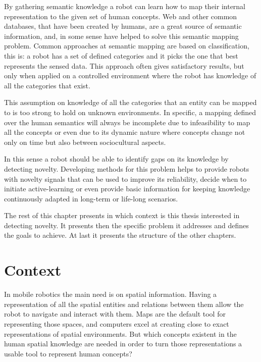 By gathering semantic knowledge a robot can learn how to map their internal representation to the
given set of human concepts. Web and other common databases, that have been created by humans, are a
great source of semantic information, and, in some sense have helped to solve this semantic mapping
problem.
Common approaches at semantic mapping are based on classification, this is: a robot has a set of
defined categories and it picks the one that best represents the sensed data. This approach often
gives satisfactory results, but only when applied on a controlled environment where the robot has
knowledge of all the categories that exist.

This assumption on knowledge of all the categories that an entity can be mapped to is too strong
to hold on unknown environments. In specific, a mapping defined over the human semantics will always
be incomplete due to infeasibility to map all the concepts or even due to its dynamic nature where
concepts change not only on time but also between sociocultural aspects.

In this sense a robot should be able to identify gaps on its knowledge by detecting novelty.
Developing methods for this problem helps to provide robots with novelty signals that can be
used to improve its reliability, decide when to initiate active-learning or even provide basic
information for keeping knowledge continuously adapted in long-term or life-long scenarios.

The rest of this chapter presents in which context is this thesis interested in detecting novelty.
It presents then the specific problem it addresses and defines the goals to achieve.
At last it presents the structure of the other chapters.

\section{Context}

%
In mobile robotics the main need is on spatial information. Having a representation of all
the spatial entities and relations between them allow the robot to navigate and interact
with them. Maps are the default tool for representing those spaces, and computers excel at
creating close to exact representations of spatial environments.
But which concepts existent in the human spatial knowledge are needed in order to turn those
representations a usable tool to represent human concepts?

